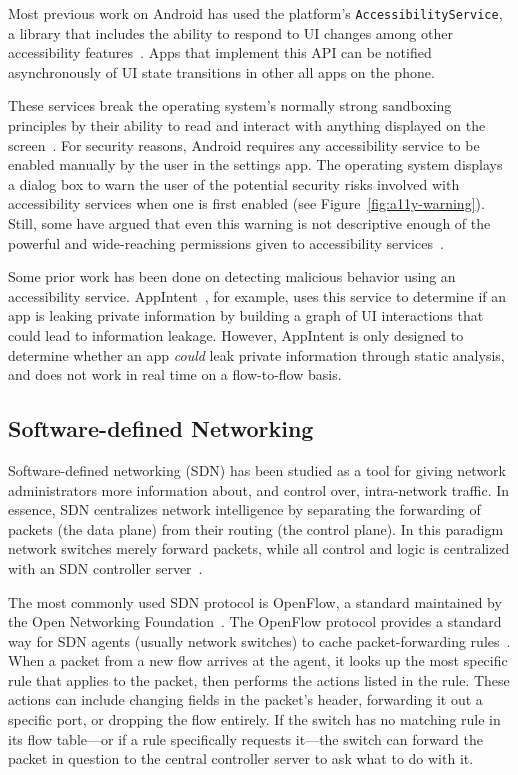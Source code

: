 Most previous work on Android has used the platform's
\texttt{AccessibilityService}, a library that includes the ability to respond to
UI changes among other accessibility features~\cite{googledevelopers2020}. Apps
that implement this API can be notified asynchronously of UI state transitions
in other all apps on the phone.

These services break the operating system's normally strong
sandboxing principles by their ability to read and interact with anything
displayed on the screen~\cite{kalysch2018}. For security reasons, Android
requires any accessibility service to be enabled manually by the user in the
settings app. The operating system displays a dialog box to warn the user of the
potential security risks involved with accessibility services when one is first
enabled (see Figure~\ref{fig:a11y-warning}). Still, some have argued that even
this warning is not descriptive enough of the powerful and wide-reaching
permissions given to accessibility services~\cite{kalysch2018}.

Some prior work has been done on detecting malicious behavior using an
accessibility service. AppIntent~\cite{yang2013}, for example, uses this service
to determine if an app is leaking private information by building a graph of UI
interactions that could lead to information leakage. However, AppIntent is only
designed to determine whether an app \textit{could} leak private information
through static analysis, and does not work in real time on a flow-to-flow basis.

\subsection{Software-defined Networking}
\label{sec:software-defined-networking}

Software-defined networking (SDN) has been studied as a tool for giving network
administrators more information about, and control over, intra-network traffic.
In essence, SDN centralizes network intelligence by separating the forwarding of
packets (the data plane) from their routing (the control plane). In this
paradigm network switches merely forward packets, while all control and logic is
centralized with an SDN controller server~\cite{kim2013}.

The most commonly used SDN protocol is OpenFlow, a standard maintained by the
Open Networking Foundation~\cite{erickson2011}. The OpenFlow protocol provides a
standard way for SDN agents (usually network switches) to cache
packet-forwarding rules~\cite{openflowspec}. When a packet from a new flow
arrives at the agent, it looks up the most specific rule that applies to the
packet, then performs the actions listed in the rule. These actions can include
changing fields in the packet's header, forwarding it out a specific port, or
dropping the flow entirely. If the switch has no matching rule in its flow
table---or if a rule specifically requests it---the switch can forward the
packet in question to the central controller server to ask what to do with it.

